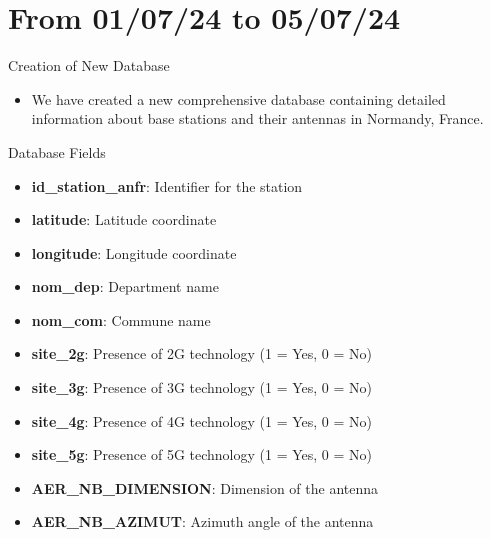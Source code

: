 \smallframetitle

\section{From 01/07/24 to 05/07/24}
\insertsectionframe


    
\begin{frame}{Creation of New Database}
    \begin{itemize}
        \item We have created a new comprehensive database containing detailed information about base stations and their antennas in Normandy, France.
    \end{itemize}
    \begin{block}{Database Fields}
        \begin{itemize}
            \item \textbf{id\_station\_anfr}: Identifier for the station
            \item \textbf{latitude}: Latitude coordinate
            \item \textbf{longitude}: Longitude coordinate
            \item \textbf{nom\_dep}: Department name
            \item \textbf{nom\_com}: Commune name
            \item \textbf{site\_2g}: Presence of 2G technology (1 = Yes, 0 = No)
            \item \textbf{site\_3g}: Presence of 3G technology (1 = Yes, 0 = No)
            \item \textbf{site\_4g}: Presence of 4G technology (1 = Yes, 0 = No)
            \item \textbf{site\_5g}: Presence of 5G technology (1 = Yes, 0 = No)
            \item \textbf{AER\_NB\_DIMENSION}: Dimension of the antenna
            \item \textbf{AER\_NB\_AZIMUT}: Azimuth angle of the antenna
        \end{itemize}
    \end{block}
\end{frame}
    
